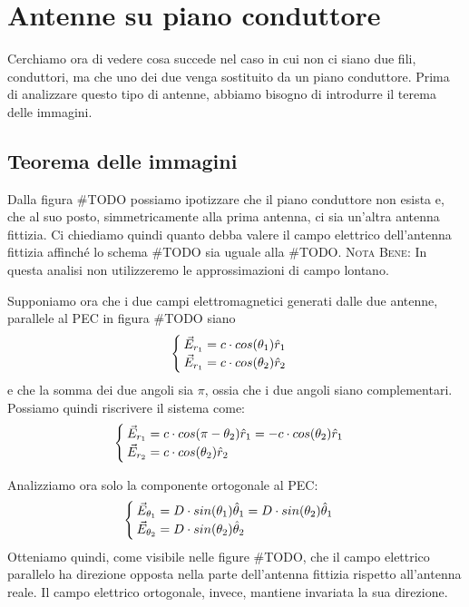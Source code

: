 \chapter{Antenne su piano conduttore}
Cerchiamo ora di vedere cosa succede nel caso in cui non ci siano due fili, conduttori, ma che uno dei due venga sostituito da un piano conduttore. Prima di analizzare questo tipo di antenne, abbiamo bisogno di introdurre il terema delle immagini.
\section{Teorema delle immagini}
Dalla figura \#TODO possiamo ipotizzare che il piano conduttore non esista e, che al suo posto, simmetricamente alla prima antenna, ci sia un'altra antenna fittizia. Ci chiediamo quindi quanto debba valere il campo elettrico dell'antenna fittizia affinché lo schema \#TODO sia uguale alla \#TODO.
\textsc{Nota Bene:} In questa analisi non utilizzeremo le approssimazioni di campo lontano.

Supponiamo ora che i due campi elettromagnetici generati dalle due antenne, parallele al PEC in figura \#TODO siano
\begin{equation}\begin{cases}
  \vec{E}_{r_1} = c \cdot cos(\theta_1)\hat{r}_1 \\
  \vec{E}_{r_1} = c \cdot cos(\theta_2)\hat{r}_2 \\
\end{cases}\end{equation}
e che la somma dei due angoli sia $\pi$, ossia che i due angoli siano complementari. Possiamo quindi riscrivere il sistema come:
\begin{equation}\begin{cases}
  \vec{E}_{r_1} = c \cdot cos(\pi-\theta_2)\hat{r}_1 = -c \cdot cos(\theta_2)\hat{r}_1 \\
  \vec{E}_{r_2} = c \cdot cos(\theta_2)\hat{r}_2 \\
\end{cases}\end{equation}

Analizziamo ora solo la componente ortogonale al PEC:
\begin{equation}\begin{cases}
  \vec{E}_{\theta_1} = D \cdot sin(\theta_1)\hat{\theta}_1 = D \cdot sin(\theta_2) \hat{\theta}_1 \\
  \vec{E}_{\theta_2} = D \cdot sin(\theta_2)\hat{\theta}_2 \\
\end{cases}\end{equation}
Otteniamo quindi, come visibile nelle figure \#TODO, che il campo elettrico parallelo ha direzione opposta nella parte dell'antenna fittizia rispetto all'antenna reale. Il campo elettrico ortogonale, invece, mantiene invariata la sua direzione.
